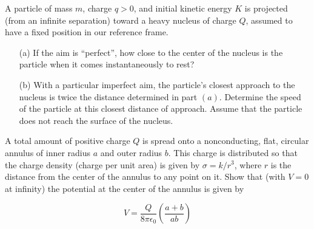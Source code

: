\documentclass[11pt,letterpaper,boxed]{hmcpset}
\begin{document}
	
	\begin{problem}[HRK P28.6]
		A particle of mass $m$, charge $q>0$, and initial kinetic energy $K$ is projected (from an infinite separation) toward a heavy nucleus of charge $Q$, assumed to have a fixed position in our reference frame.
		
		\begin{enumerate}
			\item [(a)] If the aim is ``perfect'', how close to the center of the nucleus is the particle when it comes instantaneously to rest?
			\item [(b)] With a particular imperfect aim, the particle's closest approach to the nucleus is twice the distance determined in part $(a)$. Determine the speed of the particle at this closest distance of approach. Assume that the particle does not reach the surface of the nucleus.
		\end{enumerate}

		
	\end{problem}
	
	\begin{solution}
		\vfill
	\end{solution}
	\newpage
	
	
	\begin{problem}[HRK P28.10]
		A total amount of positive charge $Q$ is spread onto a nonconducting, flat, circular annulus of inner radius $a$ and outer radius $b$. This charge is distributed so that the charge density (charge per unit area) is given by $\sigma = k/r^3$, where $r$ is the distance from the center of the annulus to any point on it. Show that (with $V = 0$ at infinity) the potential at the center of the annulus is given by
		
		\[V = \frac{Q}{8\pi \epsilon_0}\left(\frac{a+b}{ab}\right)\]
		
	\end{problem}
	
	\begin{solution}
		\vfill
	\end{solution}
	
	
\end{document}
